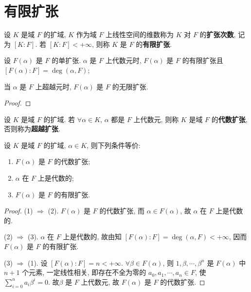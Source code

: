 \documentclass[../../main.tex]{subfiles}%
\begin{document}
\section{有限扩张}

\begin{definition}
设 $K$ 是域 $F$ 的扩域, $K$ 作为域 $F$ 上线性空间的维数称为 $K$ 对 $F$ 的\textbf{扩张次数}, 记为 $[K:F]$. 若 $[K:F]<+\infty$, 则称 $K$ 是 $F$ 的\textbf{有限扩张}.
\end{definition}

\begin{proposition}
设 $F(\alpha)$ 是 $F$ 的单扩张. $\alpha$ 是 $F$ 上代数元时, $F(\alpha)$ 是 $F$ 的有限扩张且 $[F(\alpha):F]=\deg(\alpha,F)$;

当 $\alpha$ 是 $F$ 上超越元时, $F(\alpha)$ 是 $F$ 的无限扩张.
\end{proposition}
\begin{proof}



\end{proof}

\begin{definition}
设 $K$ 是域 $F$ 的扩域. 若 $\forall \alpha\in K$, $\alpha$ 都是 $F$ 上代数元, 则称 $K$ 是域 $F$ 的\textbf{代数扩张}, 否则称为\textbf{超越扩张}.
\end{definition}

\begin{theorem}\label{theorem:定理3.2.1--抽象代数}
设 $K$ 是域 $F$ 的扩域, $\alpha\in K$, 则下列条件等价:
\begin{enumerate}[(1)]
\item $F(\alpha)$ 是 $F$ 的代数扩张;
\item $\alpha$ 在 $F$ 上是代数的;
\item $F(\alpha)$ 是 $F$ 的有限扩张.
\end{enumerate}
\end{theorem}
\begin{proof}

(1) $\Rightarrow$ (2). $F(\alpha)$ 是 $F$ 的代数扩张, 而 $\alpha\in F(\alpha)$, 故 $\alpha$ 在 $F$ 上是代数的.

(2) $\Rightarrow$ (3). $\alpha$ 在 $F$ 上是代数的, 故由知 $[F(\alpha):F]=\deg(\alpha,F)<+\infty$, 因而 $F(\alpha)$ 是 $F$ 的有限扩张.

(3) $\Rightarrow$ (1). 设 $[F(\alpha):F]=n<+\infty$. $\forall \beta\in F(\alpha)$, 则 $1,\beta,\cdots,\beta^n$ 是 $F(\alpha)$ 中 $n+1$ 个元素, 一定线性相关, 即存在不全为零的 $a_0,a_1,\cdots,a_n\in F$, 使 $\sum\limits_{i=0}^{n}a_i\beta^i=0$. 故$\beta$ 是 $F$ 上代数元, 故 $F(\alpha)$ 是 $F$ 的代数扩张.


\end{proof}
\end{document}
